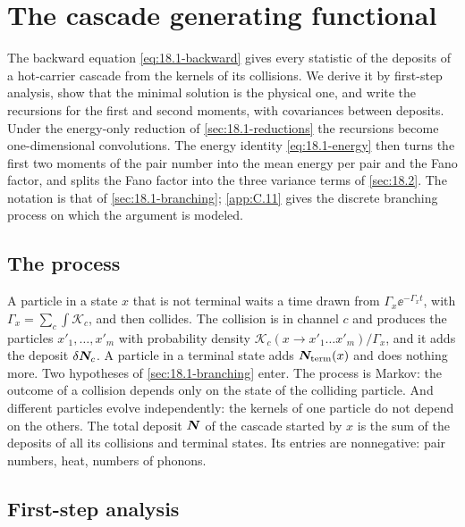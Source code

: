 \section{The cascade generating functional}\label{app:D.43}

The backward equation \cref{eq:18.1-backward} gives every statistic of the deposits of a hot-carrier cascade from the kernels of its collisions. We derive it by first-step analysis, show that the minimal solution is the physical one, and write the recursions for the first and second moments, with covariances between deposits. Under the energy-only reduction of \cref{sec:18.1-reductions} the recursions become one-dimensional convolutions. The energy identity \cref{eq:18.1-energy} then turns the first two moments of the pair number into the mean energy per pair and the Fano factor, and splits the Fano factor into the three variance terms of \cref{sec:18.2}. The notation is that of \cref{sec:18.1-branching}; \cref{app:C.11} gives the discrete branching process on which the argument is modeled.

\subsection{The process}

A particle in a state $x$ that is not terminal waits a time drawn from $\varGamma_x\ee^{-\varGamma_xt}$, with $\varGamma_x = \sum_c\int\mathscr{K}_c$, and then collides. The collision is in channel $c$ and produces the particles $x'_1, \dots, x'_m$ with probability density $\mathscr{K}_c(x \to x'_1\dots x'_m)/\varGamma_x$, and it adds the deposit $\delta\bm{N}_c$. A particle in a terminal state adds $\bm{N}_{\mathrm{term}}(x)$ and does nothing more. Two hypotheses of \cref{sec:18.1-branching} enter. The process is Markov: the outcome of a collision depends only on the state of the colliding particle. And different particles evolve independently: the kernels of one particle do not depend on the others. The total deposit $\bm{N}$ of the cascade started by $x$ is the sum of the deposits of all its collisions and terminal states. Its entries are nonnegative: pair numbers, heat, numbers of phonons.

\subsection{First-step analysis}

